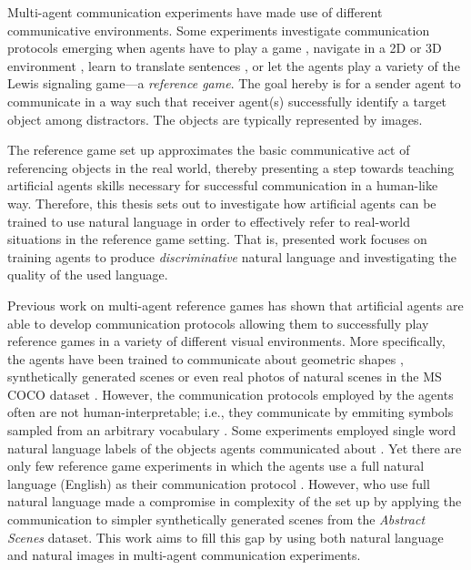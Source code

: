 Multi-agent communication experiments have made use of different communicative environments. Some experiments investigate communication protocols emerging when agents have to play a game \parencite{jacob2021multitasking}, navigate in a 2D or 3D environment \parencite{das2019tarmac, jaques2019social}, learn to translate sentences \parencite{lee2019countering}, or let the agents play a variety of the Lewis signaling game---a \textit{reference game}. The goal hereby is for a sender agent to communicate in a way such that receiver agent(s) successfully identify a target object among distractors. The objects are typically represented by images. 

The reference game set up approximates the basic communicative act of referencing objects in the real world, thereby presenting a step towards teaching artificial agents skills necessary for successful communication in a human-like way. 
Therefore, this thesis sets out to investigate how artificial agents can be trained to use natural language in order to effectively refer to real-world situations in the reference game setting. That is, presented work focuses on training agents to produce \textit{discriminative} natural language and investigating the quality of the used language. 

Previous work on multi-agent reference games has shown that artificial agents are able to develop communication protocols allowing them to successfully play reference games in a variety of different visual environments. More specifically, the agents have been trained to communicate about geometric shapes \parencite{ohmer2021and}, synthetically generated scenes \parencite{lazaridou2020multi} or even real photos of natural scenes in the MS COCO dataset \parencite{lazaridou2016multi, lin2014microsoft, havrylov2017emergence}. However, the communication protocols employed by the agents often are not human-interpretable; i.e., they communicate by emmiting symbols sampled from an arbitrary vocabulary \parencite{foerster2016learning, lazaridou2016multi}. Some experiments employed single word natural language labels of the objects agents communicated about \parencite{lazaridou2016multi}. Yet there are only few reference game experiments in which the agents use a full natural language (English) as their communication protocol \parencite[e. g.,][]{lazaridou2020multi}. However, \cite{lazaridou2020multi} who use full natural language made a compromise in complexity of the set up by applying the communication to simpler synthetically generated scenes from the \textit{Abstract Scenes} dataset. This work aims to fill this gap by using both natural language and natural images in multi-agent communication experiments. 

